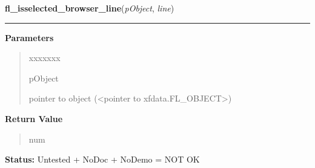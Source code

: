 \hspace{.8\funcindent}\begin{boxedminipage}{\funcwidth}

    \raggedright \textbf{fl\_isselected\_browser\_line}(\textit{pObject}, \textit{line})

    \vspace{-1.5ex}

    \rule{\textwidth}{0.5\fboxrule}
\setlength{\parskip}{2ex}
\setlength{\parskip}{1ex}
      \textbf{Parameters}
      \vspace{-1ex}

      \begin{quote}
        \begin{Ventry}{xxxxxxx}

          \item[pObject]

          pointer to object ({\textless}pointer to 
          xfdata.FL\_OBJECT{\textgreater})

        \end{Ventry}

      \end{quote}

      \textbf{Return Value}
    \vspace{-1ex}

      \begin{quote}
      num

      \end{quote}

\textbf{Status:} Untested + NoDoc + NoDemo = NOT OK



    \end{boxedminipage}

    \label{xformslib:library:fl_get_browser_topline}

    \vspace{0.5ex}

